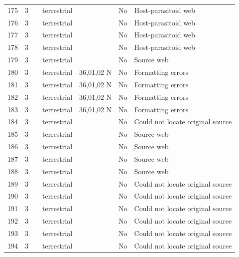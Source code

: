 \documentclass[12pt]{article}
\begin{document}
\begin{landscape}
\begin{table}[h!]
{\begin{tabular}{p{2.8cm}p{1.3cm}p{3cm}p{2.2cm}p{2.5cm}lp{8.2cm}}
        175   & 3 & \cite{Hawkins1984}    & terrestrial &       & No    & Host-parasitoid web \\
        176   & 3 & \cite{Hawkins1984}    & terrestrial &       & No    & Host-parasitoid web \\
        177   & 3 & \cite{Hawkins1984}    & terrestrial &       & No    & Host-parasitoid web \\
        178   & 3 & \cite{Hawkins1984}    & terrestrial &       & No    & Host-parasitoid web \\
        179   & 3 & \cite{Robinson1953}  & terrestrial &       & No    & Source web \\
        180   & 3 & \cite{Savely1939}    & terrestrial & 36,01,02 N & No  &  Formatting errors     \\
        181   & 3 & \cite{Savely1939}    & terrestrial & 36,01,02 N & No  &  Formatting errors     \\
        182   & 3 & \cite{Savely1939}    & terrestrial & 36,01,02 N & No  &  Formatting errors     \\
        183   & 3 & \cite{Savely1939}    & terrestrial & 36,01,02 N & No  &  Formatting errors     \\
        184   & 3 & \cite{Beaver1972}     & terrestrial &       & No    & Could not locate original source \\
        185   & 3 & \cite{Chapman1955}     & terrestrial &       & No    & Source web \\
        186   & 3 & \cite{Cornaby1974}  & terrestrial &       & No    & Source web \\
        187   & 3 & \cite{Cornaby1974}  & terrestrial &       & No    & Source web \\
        188   & 3 & \cite{Jiron1981}  & terrestrial &       & No    & Source web \\
        189   & 3 & \cite{McKinnerney1978}    & terrestrial &       & No    & Could not locate original source \\
        190   & 3 & \cite{McKinnerney1978}    & terrestrial &       & No    & Could not locate original source \\
        191   & 3 & \cite{McKinnerney1978}    & terrestrial &       & No    & Could not locate original source \\
        192   & 3 & \cite{McKinnerney1978}    & terrestrial &       & No    & Could not locate original source \\
        193   & 3 & \cite{McKinnerney1978}    & terrestrial &       & No    & Could not locate original source \\
        194   & 3 & \cite{McKinnerney1978}    & terrestrial &       & No    & Could not locate original source \\
        \hline
        \end{tabular}}%
      \end{table}


\end{landscape}
\end{document}
